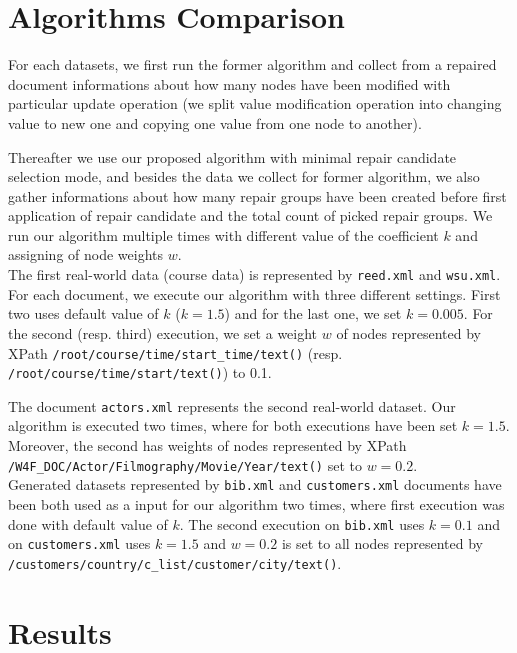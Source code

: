 \section{Algorithms Comparison}

For each datasets, we first run the former algorithm and collect from a repaired document informations about how many nodes have been modified with particular update operation (we split value modification operation into changing value to new one and copying one value from one node to another).

Thereafter we use our proposed algorithm with minimal repair candidate selection mode, and besides the data we collect for former algorithm, we also gather informations about how many repair groups have been created before first application of repair candidate and the total count of picked repair groups. We run our algorithm multiple times with different value of the coefficient $k$ and assigning of node weights $w$.\\

The first real-world data (course data) is represented by \texttt{reed.xml} and \texttt{wsu.xml}. For each document, we execute our algorithm with three different settings. First two uses default value of $k$ ($k=1.5$) and for the last one, we set $k=0.005$. For the second (resp. third) execution, we set a weight $w$ of nodes represented by XPath \texttt{/root/course/time/start\_time/text()} (resp. \texttt{/root/course/time/\discretionary{}{}{}start/text()}) to 0.1.

The document \texttt{actors.xml} represents the second real-world dataset. Our algorithm is executed two times, where for both executions have been set $k=1.5$. Moreover, the second has weights of nodes represented by XPath \texttt{/W4F\_DOC/\discretionary{}{}{}Actor/Filmography/Movie/Year/text()} set to $w=0.2$.\\

Generated datasets represented by \texttt{bib.xml} and \texttt{customers.xml} documents have been both used as a input for our algorithm two times, where first execution was done with default value of $k$. The second execution on \texttt{bib.xml} uses $k=0.1$ and on \texttt{customers.xml} uses $k=1.5$ and $w=0.2$ is set to all nodes represented by \texttt{/customers/country/c\_list/customer/city/text()}.

\section{Results}

